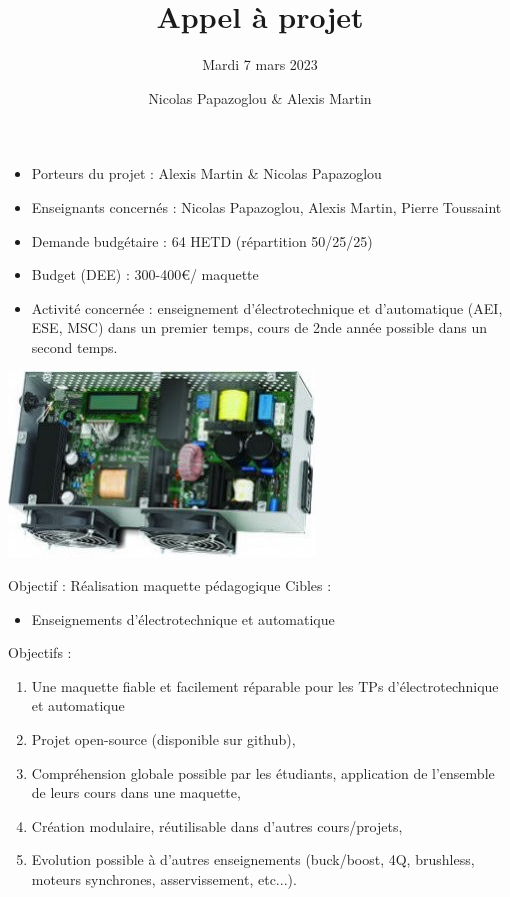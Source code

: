 \documentclass[aspectratio=169]{beamer}
\title{Appel à projet}
\subtitle{Mardi 7 mars 2023}
\date{}
\author[PAPAZOGLOU - MARTIN]{Nicolas Papazoglou \& Alexis Martin}
\institute[ENSEA]{ENSEA}
\begin{document}
\begin{frame}
	\titlepage
\end{frame}

\begin{frame}
\begin{minipage}{0.49\textwidth}
	\begin{itemize}
		\item Porteurs du projet : Alexis Martin \& Nicolas Papazoglou
		\item Enseignants concernés : Nicolas Papazoglou, Alexis Martin, Pierre Toussaint
		\item Demande budgétaire : 64 HETD  (répartition 50/25/25)
		\item Budget (DEE) : 300-400\euro / maquette
		\item Activité concernée : enseignement d'électrotechnique et d'automatique (AEI, ESE, MSC) dans un premier temps, cours de 2nde année possible dans un second temps.
	\end{itemize}
\end{minipage}
\begin{minipage}{0.49\textwidth}
	\includegraphics[scale=0.6]{inverter.jpeg} 
\end{minipage}

\end{frame}
\begin{frame}{Objectif : Réalisation maquette pédagogique}
	Cibles : 
	\begin{itemize}
		\item Enseignements d'électrotechnique et automatique
	\end{itemize}
	Objectifs : 
	\begin{enumerate}
		\item Une maquette fiable et facilement réparable pour les TPs d'électrotechnique et automatique
		\item Projet open-source (disponible sur github),
		\item Compréhension globale possible par les étudiants, application de l'ensemble de leurs cours dans une maquette,
		\item Création modulaire, réutilisable dans d'autres cours/projets, 
		\item Evolution possible à d'autres enseignements (buck/boost, 4Q, brushless, moteurs synchrones, asservissement, etc...).
	\end{enumerate}
\end{frame}
\end{document}
